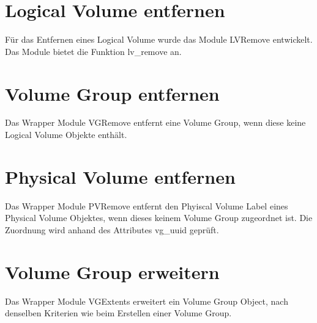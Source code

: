 \lstset{language=Ruby, basicstyle=\footnotesize, showstringspaces=false, tabsize=2}


\section{Logical Volume entfernen}
Für das Entfernen eines Logical Volume wurde das Module LVRemove entwickelt. Das Module bietet die Funktion lv\_remove an.

\lstset{language=Ruby, basicstyle=\footnotesize, showstringspaces=false, tabsize=2}


\section{Volume Group entfernen}
Das Wrapper Module VGRemove entfernt eine Volume Group, wenn diese keine Logical Volume Objekte enthält.

\lstset{language=Ruby, basicstyle=\footnotesize, showstringspaces=false, tabsize=2}


\section{Physical Volume entfernen}
Das Wrapper Module PVRemove entfernt den Phyiscal Volume Label eines Physical Volume Objektes, wenn dieses keinem Volume Group zugeordnet ist. Die Zuordnung wird anhand des Attributes vg\_uuid geprüft.

\lstset{language=Ruby, basicstyle=\footnotesize, showstringspaces=false, tabsize=2}


\section{Volume Group erweitern}
Das Wrapper Module VGExtents erweitert ein Volume Group Object, nach denselben Kriterien wie beim Erstellen einer Volume Group.

\lstset{language=Ruby, basicstyle=\footnotesize, showstringspaces=false, tabsize=2}



